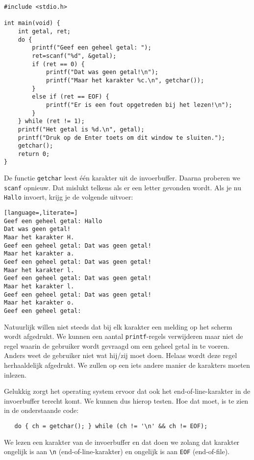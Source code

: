 \documentclass[a4paper,10pt,fleqn,twoside]{article}
\begin{document}
\begin{lstlisting}
#include <stdio.h>

int main(void) {
    int getal, ret;
    do {
        printf("Geef een geheel getal: ");
        ret=scanf("%d", &getal);
        if (ret == 0) {
            printf("Dat was geen getal!\n");
            printf("Maar het karakter %c.\n", getchar());
        }
        else if (ret == EOF) {
            printf("Er is een fout opgetreden bij het lezen!\n");
        }
    } while (ret != 1);
    printf("Het getal is %d.\n", getal);
    printf("Druk op de Enter toets om dit window te sluiten.");
    getchar();
    return 0;
}

\end{lstlisting}

De functie \lstinline|getchar| leest één karakter uit de invoerbuffer. Daarna proberen we \lstinline|scanf| opnieuw. Dat mislukt telkens als er een letter gevonden wordt. Als je nu \lstinline|Hallo| invoert, krijg je de volgende uitvoer:

\begin{lstlisting}[language=,literate=]
Geef een geheel getal: Hallo
Dat was geen getal!
Maar het karakter H.
Geef een geheel getal: Dat was geen getal!
Maar het karakter a.
Geef een geheel getal: Dat was geen getal!
Maar het karakter l.
Geef een geheel getal: Dat was geen getal!
Maar het karakter l.
Geef een geheel getal: Dat was geen getal!
Maar het karakter o.
Geef een geheel getal:
\end{lstlisting}

Natuurlijk willen niet steeds dat bij elk karakter een melding op het scherm wordt afgedrukt. We kunnen een aantal \lstinline|printf|-regels verwijderen maar niet de regel waarin de gebruiker wordt gevraagd om een geheel getal in te voeren. Anders weet de gebruiker niet wat hij/zij moet doen. Helaas wordt deze regel herhaaldelijk afgedrukt. We zullen op een iets andere manier de karakters moeten inlezen.

Gelukkig zorgt het operating system ervoor dat ook het end-of-line-karakter in de invoerbuffer terecht komt. We kunnen dus hierop testen. Hoe dat moet, is te zien in de onderstaande code:

\begin{lstlisting}
   do { ch = getchar(); } while (ch != '\n' && ch != EOF);
\end{lstlisting}

We lezen een karakter van de invoerbuffer en dat doen we zolang dat karakter ongelijk is aan \lstinline|\n| (end-of-line-karakter) en ongelijk is aan \lstinline|EOF| (end-of-file).
\end{document}
